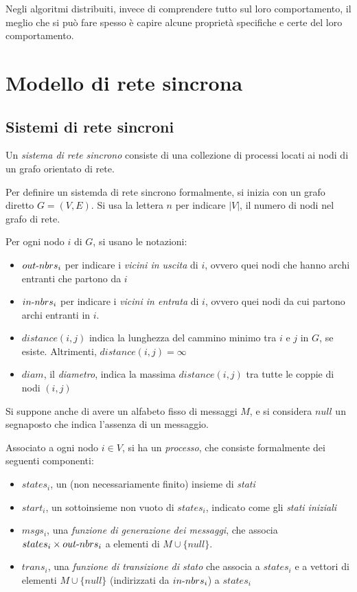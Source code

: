 \documentclass[italian,]{book}
\providecommand{\tightlist}{%
  \setlength{\itemsep}{0pt}\setlength{\parskip}{0pt}}
\begin{document}
Negli algoritmi distribuiti, invece di comprendere tutto sul loro
comportamento, il meglio che si può fare spesso è capire alcune
proprietà specifiche e certe del loro comportamento.

\hypertarget{modello-di-rete-sincrona}{%
\chapter{Modello di rete sincrona}\label{modello-di-rete-sincrona}}

\hypertarget{sistemi-di-rete-sincroni}{%
\section{Sistemi di rete sincroni}\label{sistemi-di-rete-sincroni}}

Un \emph{sistema di rete sincrono} consiste di una collezione di
processi locati ai nodi di un grafo orientato di rete.

Per definire un sistemda di rete sincrono formalmente, si inizia con un
grafo diretto \(G = (V,E)\). Si usa la lettera \(n\) per indicare
\(|V|\), il numero di nodi nel grafo di rete.

Per ogni nodo \(i\) di \(G\), si usano le notazioni:

\begin{itemize}
\tightlist
\item
  \(out\text{-}nbrs_i\) per indicare i \emph{vicini in uscita} di \(i\), ovvero
  quei nodi che hanno archi entranti che partono da \(i\)
\item
  \(in\text{-}nbrs_i\) per indicare i \emph{vicini in entrata} di \(i\), ovvero
  quei nodi da cui partono archi entranti in \(i\).
\item
  \(distance(i,j)\) indica la lunghezza del cammino minimo tra \(i\) e
  \(j\) in \(G\), se esiste. Altrimenti, \(distance(i,j) = \infty\)
\item
  \(diam\), il \emph{diametro}, indica la massima \(distance(i,j)\) tra
  tutte le coppie di nodi \((i,j)\)
\end{itemize}

Si suppone anche di avere un alfabeto fisso di messaggi \(M\), e si
considera \(null\) un segnaposto che indica l'assenza di un messaggio.

Associato a ogni nodo \(i \in V\), si ha un \emph{processo}, che
consiste formalmente dei seguenti componenti:

\begin{itemize}
\tightlist
\item
  \(states_i\), un (non necessariamente finito) insieme di \emph{stati}
\item
  \(start_i\), un sottoinsieme non vuoto di \(states_i\), indicato come
  gli \emph{stati iniziali}
\item
  \(msgs_i\), una \emph{funzione di generazione dei messaggi}, che
  associa \(states_i \times out\text{-}nbrs_i\) a elementi di
  \(M \cup \{null\}\).
\item
  \(trans_i\), una \emph{funzione di transizione di stato} che associa a
  \(states_i\) e a vettori di elementi \(M \cup \{null\}\) (indirizzati
  da \(in\text{-}nbrs_i\)) a \(states_i\)
\end{itemize}
\end{document}
